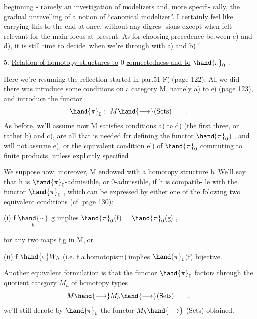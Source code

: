 
beginning  -  namely an investigation of modelizers and,  more specifi-%
cally,  the gradual unravelling of a notion of ``canonical modelizer''.  I
certainly feel like carrying this to the end at once,  without any digres-%
sions except when felt relevant for the main focus at present.  As for
choosing precedence between c) and d),  it is still time to decide,  when
we're through with a) and b) !

5.  \uline{Relation of homotopy structures to} 0-\uline{connectedness and to} $\hand{\pi}_0$ .

Here we're resuming the reflection started in par.51 F) (page 122).
All we did there was introduce some conditions on a category M,  namely
a) to e)  (page 123),  and introduce the functor
\[ \hand{\pi}_0 :\ M \hand{\longrightarrow} (\mathrm{Sets}) \qquad . \]
As before,  we'll assume now M satisfies conditions a) to d)  (the first
three, or rather b) and c),  are all that is needed for defining the
functor $\hand{\pi}_0$) ,  and will not assume e),  or the equivalent condition e')
of $\hand{\pi}_0$ commuting to  finite products,  unless explicitly specified.

We suppose now,  moreover,  M endowed with a homotopy structure h.
We'll say that h is $\hand{\pi}_0$-\uline{admissible},  or  0-\uline{admissible},  if  h is compatib-%
le with the functor $\hand{\pi}_0$ ,  which can be expressed by either one of the
folowing two equivalent conditions (cf. page 130):

(i)  f $\underset{h}{\hand{\sim}}$ g  implies $\hand{\pi}_0$(f) = $\hand{\pi}_0$(g)  ,

for any two maps  f,g in M,  or

(ii)  f $\hand{\in} W_h$ (i.e. f a homotopism)  implies $\hand{\pi}_0$(f) bijective.

Another equivalent formulation is that the functor $\hand{\pi}_0$ factors through
the quotient category $M_h$ of homotopy types
\[ M \hand{\longrightarrow} M_h \hand{\longrightarrow} (\mathrm{Sets}) \qquad , \]
we'll still denote by $\hand{\pi}_0$ the functor $M_h \hand{\longrightarrow}$ (Sets)  obtained.

